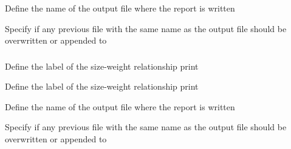  {Define the name of the output file where the report is written}

 {Specify if any previous file with the same name as the output file should be overwritten or appended to}

\subsubsection[Print the weight-at-size]{}

 {Define the label of the size-weight relationship print}

 {Define the label of the size-weight relationship print}

 {Define the name of the output file where the report is written}

 {Specify if any previous file with the same name as the output file should be overwritten or appended to}
